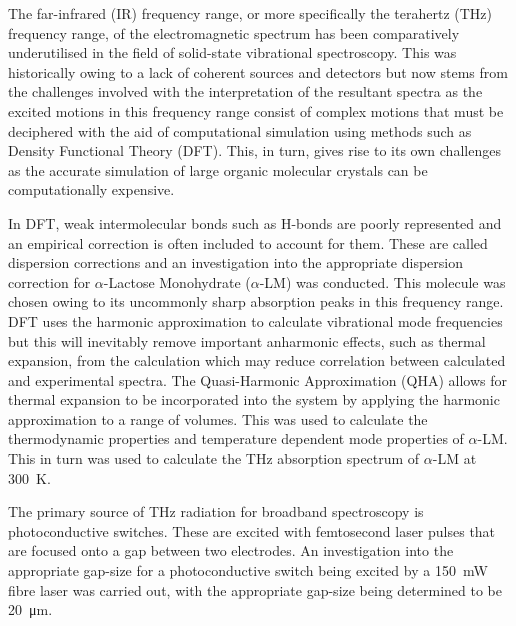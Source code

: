 The far-infrared (IR) frequency range, or more specifically the terahertz (THz) frequency range, of the electromagnetic spectrum has been comparatively underutilised in the field of solid-state vibrational spectroscopy. This was historically owing to a lack of coherent sources and detectors but now stems from the challenges involved with the interpretation of the resultant spectra as the excited motions in this frequency range consist of complex motions that must be deciphered with the aid of computational simulation using methods such as Density Functional Theory (DFT). This, in turn, gives rise to its own challenges as the accurate simulation of large organic molecular crystals can be computationally expensive. 

In DFT, weak intermolecular bonds such as H-bonds are poorly represented and an empirical correction is often included to account for them. These are called dispersion corrections and an investigation into the appropriate dispersion correction for \(\alpha\)-Lactose Monohydrate (\(\alpha\)-LM) was conducted. This molecule was chosen owing to its uncommonly sharp absorption peaks in this frequency range. DFT uses the harmonic approximation to calculate vibrational mode frequencies but this will inevitably remove important anharmonic effects, such as thermal expansion, from the calculation which may reduce correlation between calculated and experimental spectra. The Quasi-Harmonic Approximation (QHA) allows for thermal expansion to be incorporated into the system by applying the harmonic approximation to a range of volumes. This was used to calculate the thermodynamic properties and temperature dependent mode properties of \(\alpha\)-LM. This in turn was used to calculate the THz absorption spectrum of \(\alpha\)-LM at \SI{300}{K}.

The primary source of THz radiation for broadband spectroscopy is photoconductive switches. These are excited with femtosecond laser pulses that are focused onto a gap between two electrodes. An investigation into the appropriate gap-size for a photoconductive switch being excited by a \SI{150}{mW} fibre laser was carried out, with the appropriate gap-size being determined to be \SI{20}{\micro\metre}.
